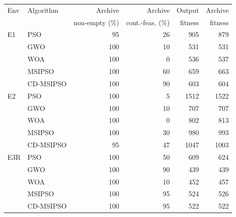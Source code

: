\begin{tabular}{llrrrr}
\hline
Env & Algorithm & Archive & Archive & Output & Archive \\
 & & non-empty (\%) & cont.-feas. (\%) & fitness & fitness \\
\hline
E1 & PSO & 95 & 26 & 905 & 879 \\
 & GWO & 100 & 10 & 531 & 531 \\
 & WOA & 100 & 0 & 536 & 537 \\
 & MSIPSO & 100 & 60 & 659 & 663 \\
 & CD-MSIPSO & 100 & 90 & 603 & 604 \\
\hline
E2 & PSO & 100 & 5 & 1512 & 1522 \\
 & GWO & 100 & 10 & 707 & 707 \\
 & WOA & 100 & 0 & 802 & 813 \\
 & MSIPSO & 100 & 30 & 980 & 993 \\
 & CD-MSIPSO & 95 & 47 & 1047 & 1003 \\
\hline
E3R & PSO & 100 & 50 & 609 & 624 \\
 & GWO & 100 & 90 & 439 & 439 \\
 & WOA & 100 & 10 & 452 & 457 \\
 & MSIPSO & 100 & 95 & 524 & 526 \\
 & CD-MSIPSO & 100 & 95 & 522 & 522 \\
\hline
\end{tabular}
